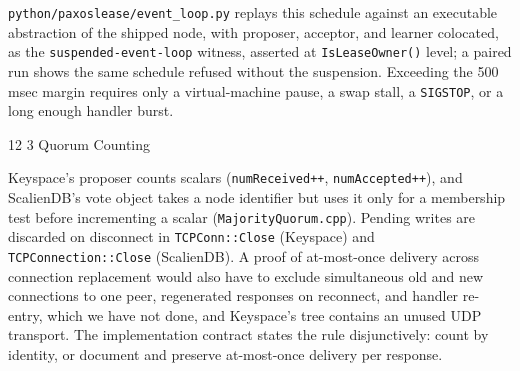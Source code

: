 \documentclass[final,5p,times,twocolumn,number]{elsarticle}
\makeatletter
\newcommand{\code}[1]{\texttt{#1}}
\renewcommand\subsection{\@startsection{subsection}{2}{\z@}%
           {12\p@ \@plus 6\p@ \@minus 3\p@}%
           {3\p@ \@plus 6\p@ \@minus 3\p@}%
           {\normalfont\normalsize\bfseries}}
\makeatother
\begin{document}
\code{python/paxoslease/event\_loop.py} replays this schedule against an executable abstraction of the shipped node, with proposer, acceptor, and learner colocated, as the \code{suspended-event-loop} witness, asserted at \code{IsLeaseOwner()} level; a paired run shows the same schedule refused without the suspension.  Exceeding the 500 msec margin requires only a virtual-machine pause, a swap stall, a \code{SIGSTOP}, or a long enough handler burst.

\subsection{Quorum Counting}

Keyspace's proposer counts scalars (\code{numReceived++}, \code{numAccepted++}), and ScalienDB's vote object takes a node identifier but uses it only for a membership test before incrementing a scalar (\code{MajorityQuorum.cpp}).  Pending writes are discarded on disconnect in \code{TCPConn::Close} (Keyspace) and \code{TCPConnection::Close} (ScalienDB).  A proof of at-most-once delivery across connection replacement would also have to exclude simultaneous old and new connections to one peer, regenerated responses on reconnect, and handler re-entry, which we have not done, and Keyspace's tree contains an unused UDP transport.  The implementation contract states the rule disjunctively: count by identity, or document and preserve at-most-once delivery per response.
\end{document}
